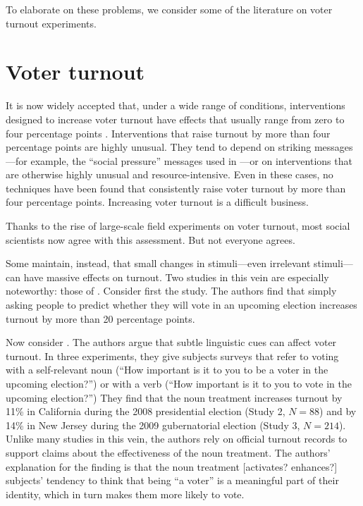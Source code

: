 \documentclass[11pt,letterpaper]{article}
\begin{document}
To elaborate on these problems, we consider some of the literature on voter
turnout experiments.

\section{Voter turnout}

It is now widely accepted that, under a wide range of conditions, interventions
designed to increase voter turnout have effects that usually range from zero to
four percentage points \citep*{gerber2020}. Interventions that raise turnout by
more than four percentage points are highly unusual. They tend to depend on
striking messages---for example, the ``social pressure'' messages used in
\citet*{gerber2008}---or on interventions that are otherwise highly unusual and
resource-intensive. Even in these cases, no techniques have been found that
consistently raise voter turnout by more than four percentage points. Increasing
voter turnout is a difficult business.

Thanks to the rise of large-scale field experiments on voter turnout, most
social scientists now agree with this assessment. But not everyone agrees.

Some maintain, instead, that small changes in stimuli---even irrelevant
stimuli---can have massive effects on turnout. Two studies in this vein are
especially noteworthy: those of \citet{greenwald1987,bryan2011}. Consider first
the \citet{greenwald1987} study. The authors find that simply asking people to
predict whether they will vote in an upcoming election increases turnout by more
than 20 percentage points.

Now consider \citet{bryan2011}. The authors argue that subtle linguistic cues
can affect voter turnout. In three experiments, they give subjects surveys that
refer to voting with a self-relevant noun (``How important is it to you to be a
voter in the upcoming election?'') or with a verb (``How important is it to you
to vote in the upcoming election?'') They find that the noun treatment increases
turnout by 11\% in California during the 2008 presidential election (Study 2,
$N = 88$) and by 14\% in New Jersey during the 2009 gubernatorial election
(Study 3, $N = 214$). Unlike many studies in this vein, the authors rely on
official turnout records to support claims about the effectiveness of the noun
treatment. The authors' explanation for the finding is that the noun treatment
[activates? enhances?] subjects' tendency to think that being ``a voter'' is a
meaningful part of their identity, which in turn makes them more likely to vote.
\end{document}
